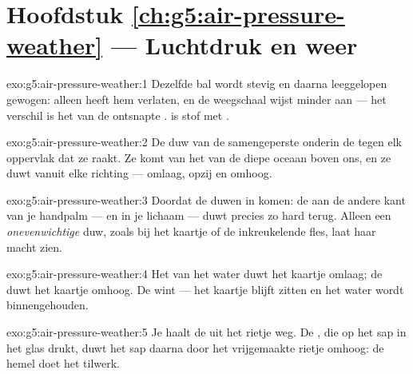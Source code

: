 \section*{Hoofdstuk \ref{ch:g5:air-pressure-weather} --- Luchtdruk en weer}

\begin{solution}{exo:g5:air-pressure-weather:1}
Dezelfde bal wordt stevig en daarna leeggelopen gewogen: alleen
 heeft hem verlaten, en de weegschaal wijst minder aan --- het
verschil is het  van de ontsnapte .  is stof
met .
\end{solution}

\begin{solution}{exo:g5:air-pressure-weather:2}
De duw van de samengeperste  onderin de  tegen elk
oppervlak dat ze raakt. Ze komt van het  van de diepe oceaan
 boven ons, en ze duwt vanuit elke richting --- omlaag, opzij en
omhoog.
\end{solution}

\begin{solution}{exo:g5:air-pressure-weather:3}
Doordat de duwen in  komen: de  aan de andere kant van
je handpalm --- en in je lichaam --- duwt precies zo hard terug.
Alleen een \emph{onevenwichtige} duw, zoals bij het kaartje of de
inkreukelende fles, laat haar macht zien.
\end{solution}

\begin{solution}{exo:g5:air-pressure-weather:4}
Het  van het water duwt het kaartje omlaag; de
 duwt het kaartje omhoog. De  wint --- het
kaartje blijft zitten en het water wordt binnengehouden.
\end{solution}

\begin{solution}{exo:g5:air-pressure-weather:5}
Je haalt de \emph{} uit het rietje weg. De , die op het
sap in het glas drukt, duwt het sap daarna door het vrijgemaakte
rietje omhoog: de hemel doet het tilwerk.
\end{solution}

